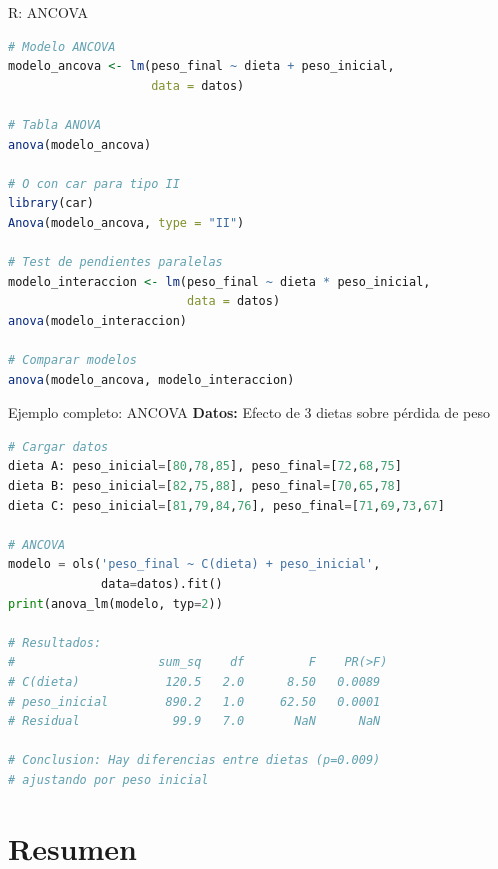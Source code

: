 \documentclass[aspectratio=169]{beamer}
\begin{document}
\begin{frame}[fragile]{R: ANCOVA}
\begin{lstlisting}[language=R]
# Modelo ANCOVA
modelo_ancova <- lm(peso_final ~ dieta + peso_inicial,
                    data = datos)

# Tabla ANOVA
anova(modelo_ancova)

# O con car para tipo II
library(car)
Anova(modelo_ancova, type = "II")

# Test de pendientes paralelas
modelo_interaccion <- lm(peso_final ~ dieta * peso_inicial,
                         data = datos)
anova(modelo_interaccion)

# Comparar modelos
anova(modelo_ancova, modelo_interaccion)
\end{lstlisting}
\end{frame}

\begin{frame}[fragile]{Ejemplo completo: ANCOVA}
\textbf{Datos:} Efecto de 3 dietas sobre pérdida de peso

\begin{lstlisting}[language=Python]
# Cargar datos
dieta A: peso_inicial=[80,78,85], peso_final=[72,68,75]
dieta B: peso_inicial=[82,75,88], peso_final=[70,65,78]
dieta C: peso_inicial=[81,79,84,76], peso_final=[71,69,73,67]

# ANCOVA
modelo = ols('peso_final ~ C(dieta) + peso_inicial',
             data=datos).fit()
print(anova_lm(modelo, typ=2))

# Resultados:
#                    sum_sq    df         F    PR(>F)
# C(dieta)            120.5   2.0      8.50   0.0089
# peso_inicial        890.2   1.0     62.50   0.0001
# Residual             99.9   7.0       NaN      NaN

# Conclusion: Hay diferencias entre dietas (p=0.009)
# ajustando por peso inicial
\end{lstlisting}
\end{frame}

\section{Resumen}
\end{document}
